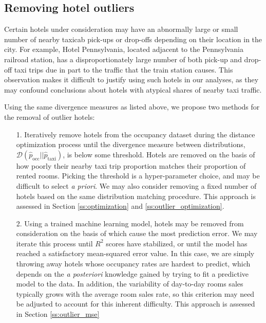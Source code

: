 \documentclass[useAMS, usenatbib]{biom}
\begin{document}
\subsection{Removing hotel outliers}
\label{ss:hotel_outliers}

Certain hotels under consideration may have an abnormally large or small number of nearby taxicab pick-ups or drop-offs depending on their location in the city. For example, Hotel Pennsylvania, located adjacent to the Pennsylvania railroad station, has a disproportionately large number of both pick-up and drop-off taxi trips due in part to the traffic that the train station causes. This observation makes it difficult to justify using such hotels in our analyses, as they may confound conclusions about hotels with atypical shares of nearby taxi traffic.

Using the same divergence measures as listed above, we propose two methods for the removal of outlier hotels:

\begin{itemize}

\item [1.] Iteratively remove hotels from the occupancy dataset during the distance optimization process until the divergence measure between distributions, $\mathcal{D} (\hat{p}_{\mathrm{occ}} || \hat{p}_{\mathrm{taxi}})$, is below some threshold. Hotels are removed on the basis of how poorly their nearby taxi trip proportion matches their proportion of rented rooms. Picking the threshold is a hyper-parameter choice, and may be difficult to select \textit{a priori}. We may also consider removing a fixed number of hotels based on the same distribution matching procedure. This approach is assessed in Section \ref{ss:optimization} and \ref{ss:outlier_optimization}.

\item [2.] Using a trained machine learning model, hotels may be removed from consideration on the basis of which cause the most prediction error. We may iterate this process until $R^2$ scores have stabilized, or until the model has reached a satisfactory mean-squared error value. In this case, we are simply throwing away hotels whose occupancy rates are hardest to predict, which depends on the \textit{a posteriori} knowledge gained by trying to fit a predictive model to the data. In addition, the variability of day-to-day rooms sales typically grows with the average room sales rate, so this criterion may need be adjusted to account for this inherent difficulty. This approach is assessed in Section \ref{ss:outlier_mse}

\end{itemize}
\end{document}
